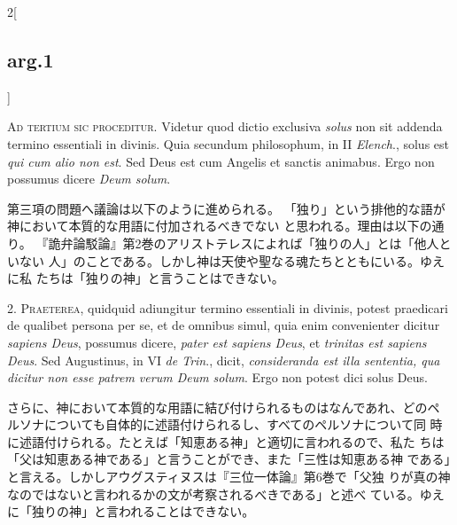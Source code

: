 \documentclass[paper=a4paper,fontsize=10pt,jafontsize=9pt,titlepage]{jlreq}
\begin{document}
\begin{paracol}{2}[\subsection{arg.1}]

{\scshape Ad tertium sic proceditur}. Videtur quod dictio exclusiva {\itshape solus} non sit
 addenda termino essentiali in divinis. Quia secundum philosophum, in
 II {\itshape Elench}., solus est {\itshape qui cum alio non est}. Sed Deus est cum Angelis
 et sanctis animabus. Ergo non possumus dicere {\itshape Deum solum}.

\switchcolumn

第三項の問題へ議論は以下のように進められる。
「独り」という排他的な語が神において本質的な用語に付加されるべきでない
 と思われる。理由は以下の通り。
『詭弁論駁論』第2巻のアリストテレスによれば「独りの人」とは「他人といない
 人」のことである。しかし神は天使や聖なる魂たちとともにいる。ゆえに私
 たちは「独りの神」と言うことはできない。


2. {\scshape Praeterea}, quidquid adiungitur termino essentiali in divinis, potest
 praedicari de qualibet persona per se, et de omnibus simul, quia enim
 convenienter dicitur {\itshape sapiens Deus}, possumus dicere, {\itshape pater est sapiens
 Deus}, et {\itshape trinitas est sapiens Deus}. Sed Augustinus, in VI {\itshape de Trin}.,
 dicit, {\itshape consideranda est illa sententia, qua dicitur non esse patrem
 verum Deum solum}. Ergo non potest dici solus Deus.

\switchcolumn

さらに、神において本質的な用語に結び付けられるものはなんであれ、どのペ
 ルソナについても自体的に述語付けられるし、すべてのペルソナについて同
 時に述語付けられる。たとえば「知恵ある神」と適切に言われるので、私た
 ちは「父は知恵ある神である」と言うことができ、また「三性は知恵ある神
 である」と言える。しかしアウグスティヌスは『三位一体論』第6巻で「父独
 りが真の神なのではないと言われるかの文が考察されるべきである」と述べ
 ている。ゆえに「独りの神」と言われることはできない。



\end{paracol}
\end{document}

